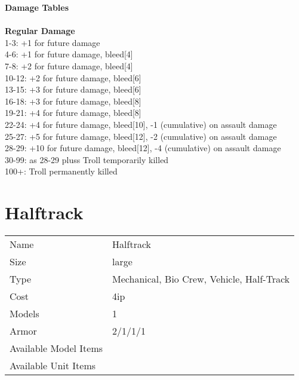 {\bf Damage Tables} \\
\ \\ {\bf Regular Damage } \\
1-3: +1 for future damage \\
4-6: +1 for future damage, bleed[4] \\
7-8: +2 for future damage, bleed[4] \\
10-12: +2 for future damage, bleed[6] \\
13-15: +3 for future damage, bleed[6] \\
16-18: +3 for future damage, bleed[8] \\
19-21: +4 for future damage, bleed[8] \\
22-24: +4 for future damage, bleed[10], -1 (cumulative) on assault damage \\
25-27: +5 for future damage, bleed[12], -2 (cumulative) on assault damage \\
28-29: +10 for future damage, bleed[12], -4 (cumulative) on assault damage \\
30-99: as 28-29 pluss Troll temporarily killed \\
100+: Troll permanently killed \\









\pagebreak

\section{ Halftrack }

\begin{tabular}{ll}
  Name & Halftrack \\
  Size & large\\
  Type & Mechanical, Bio Crew, Vehicle, Half-Track\\
  Cost & 4ip\\
  Models & 1\\
  Armor & 2/1/1/1\\
  Available Model Items &  \\
  Available Unit Items &  \\
\end{tabular}


